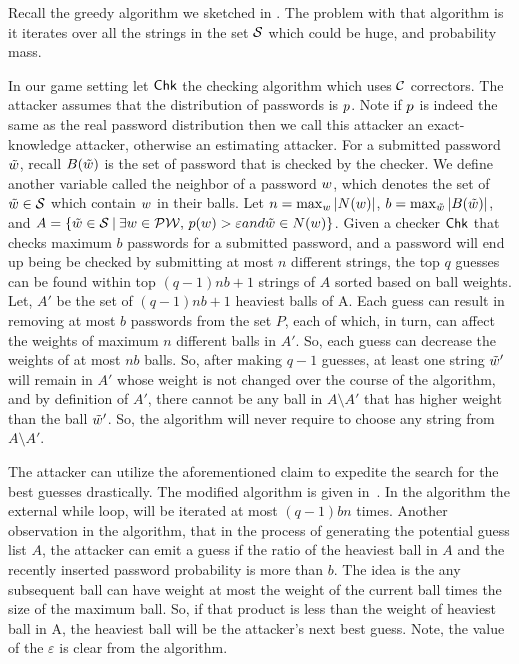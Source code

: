 Recall the greedy algorithm we sketched in 
. The problem with that algorithm is it iterates
over all the strings in the set $\mathcal{S}$ which could be huge, and
probability mass.  

In our game setting let $\textnormal{\textsf{Chk}}$ the checking algorithm which uses
${\mathcal C}$ correctors. The attacker assumes that the distribution of
passwords is $p$.  Note if $p$ is indeed the same as the
real password distribution then we call this attacker an exact-knowledge
attacker, otherwise an estimating attacker.  For a submitted password
$\tilde{w}$, recall $B(\tilde{w})$ is the set of password that is
checked by the checker.  We define another variable called the
neighbor of a password ${w}$, which denotes the set of
$\tilde{w}\in\mathcal{S}$ which contain ${w}$ in their balls.  Let
$n = \max_{w}{|N({w})|}$, $b = \max_{\tilde{w}} |B(\tilde{w})|$, and
$A = \{\tilde{w} \in \mathcal{S} \:|\: \exists {w}\in\mathcal{PW},\,
p({w})>\varepsilon \relax{ and } \tilde{w}\in N(w)\}$.
{\claim Given a checker $\textnormal{\textsf{Chk}}$ that checks maximum $b$ passwords
  for a submitted password, and a password will end up being be
  checked by submitting at most $n$ different strings, the top $q$
  guesses can be found within top $(q-1)nb+1$ strings of $A$ sorted
  based on ball
  weights}.  \\
\Proof Let, $A'$ be the set of $(q-1)nb+1$ heaviest balls of A. Each
guess can result in removing at most $b$ passwords from the set $P$,
each of which, in turn, can affect the weights of maximum $n$
different balls in $A'$. So, each guess can decrease the weights of at
most $nb$ balls. So, after making $q-1$ guesses, at least one string
$\tilde{w}'$ will remain in $A'$ whose weight is not changed over the
course of the algorithm, and by definition of $A'$, there cannot be
any ball in $A\setminus A'$ that has higher weight than the ball
$\tilde{w}'$. So, the algorithm will never require to choose any string
from $A\setminus A'$.

The attacker can utilize the aforementioned claim to expedite the
search for the best guesses drastically. The modified algorithm is
given in~. In the algorithm the external while
loop, will be iterated at most $(q-1)bn$ times.  Another observation
in the algorithm, that in the process of generating the potential
guess list $A$, the attacker can emit a guess if the ratio of the
heaviest ball in $A$ and the recently inserted password probability is
more than $b$.  The idea is the any subsequent ball can have weight at
most the weight of the current ball times the size of the maximum
ball. So, if that product is less than the weight of heaviest ball in
A, the heaviest ball will be the attacker's next best guess.  Note,
the value of the $\varepsilon$ is clear from the algorithm.

